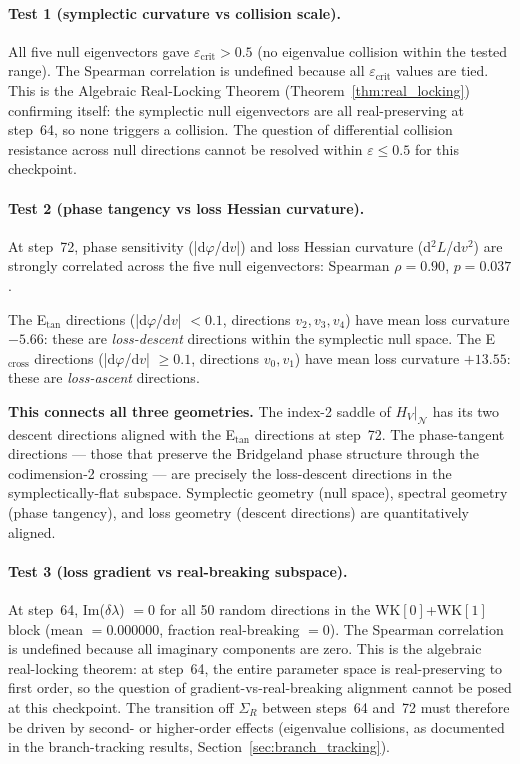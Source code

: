 \documentclass[11pt]{amsart}
\begin{document}
\paragraph{Test 1 (symplectic curvature vs collision scale).}
All five null eigenvectors gave $\varepsilon_\mathrm{crit} > 0.5$
(no eigenvalue collision within the tested range).
The Spearman correlation is undefined because all $\varepsilon_\mathrm{crit}$
values are tied.
This is the Algebraic Real-Locking Theorem
(Theorem~\ref{thm:real_locking}) confirming itself:
the symplectic null eigenvectors are all real-preserving at step~64,
so none triggers a collision.
The question of differential collision resistance across null directions
cannot be resolved within $\varepsilon \leq 0.5$ for this checkpoint.

\paragraph{Test 2 (phase tangency vs loss Hessian curvature).}
At step~72, phase sensitivity (|d$\varphi$/d$v$|) and loss Hessian
curvature (d$^2L$/d$v^2$) are strongly correlated across the five null
eigenvectors: Spearman $\rho = 0.90$, $p = 0.037$.

The E$_\mathrm{tan}$ directions (|d$\varphi$/d$v$| $< 0.1$, directions $v_2, v_3, v_4$)
have mean loss curvature $-5.66$: these are \emph{loss-descent} directions
within the symplectic null space.
The E$_\mathrm{cross}$ directions (|d$\varphi$/d$v$| $\geq 0.1$, directions $v_0, v_1$)
have mean loss curvature $+13.55$: these are \emph{loss-ascent} directions.

\textbf{This connects all three geometries.}
The index-2 saddle of $H_V|_\mathcal{N}$ has its two descent directions
aligned with the E$_\mathrm{tan}$ directions at step~72.
The phase-tangent directions --- those that preserve the Bridgeland
phase structure through the codimension-2 crossing --- are precisely
the loss-descent directions in the symplectically-flat subspace.
Symplectic geometry (null space), spectral geometry (phase tangency),
and loss geometry (descent directions) are quantitatively aligned.

\paragraph{Test 3 (loss gradient vs real-breaking subspace).}
At step~64, Im($\delta\lambda$) $= 0$ for all 50 random directions
in the WK$[0]$+WK$[1]$ block (mean $= 0.000000$, fraction real-breaking $= 0$).
The Spearman correlation is undefined because all imaginary components are zero.
This is the algebraic real-locking theorem: at step~64, the entire
parameter space is real-preserving to first order, so the question
of gradient-vs-real-breaking alignment cannot be posed at this checkpoint.
The transition off $\Sigma_R$ between steps~64 and~72 must therefore
be driven by second- or higher-order effects (eigenvalue collisions,
as documented in the branch-tracking results, Section~\ref{sec:branch_tracking}).
\end{document}
